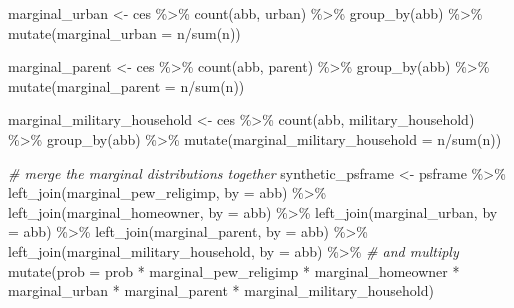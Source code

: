\documentclass[
]{article}
\newenvironment{Shaded}{\begin{snugshade}}{\end{snugshade}}
\newcommand{\AttributeTok}[1]{\textcolor[rgb]{0.77,0.63,0.00}{#1}}
\newcommand{\CommentTok}[1]{\textcolor[rgb]{0.56,0.35,0.01}{\textit{#1}}}
\newcommand{\FunctionTok}[1]{\textcolor[rgb]{0.00,0.00,0.00}{#1}}
\newcommand{\NormalTok}[1]{#1}
\newcommand{\OtherTok}[1]{\textcolor[rgb]{0.56,0.35,0.01}{#1}}
\newcommand{\SpecialCharTok}[1]{\textcolor[rgb]{0.00,0.00,0.00}{#1}}
\newcommand{\StringTok}[1]{\textcolor[rgb]{0.31,0.60,0.02}{#1}}
\begin{document}
\begin{Shaded}
\begin{Highlighting}[]
\NormalTok{marginal\_urban }\OtherTok{\textless{}{-}}\NormalTok{ ces }\SpecialCharTok{\%\textgreater{}\%} 
  \FunctionTok{count}\NormalTok{(abb, urban) }\SpecialCharTok{\%\textgreater{}\%} 
  \FunctionTok{group\_by}\NormalTok{(abb) }\SpecialCharTok{\%\textgreater{}\%} 
  \FunctionTok{mutate}\NormalTok{(}\AttributeTok{marginal\_urban =}\NormalTok{ n}\SpecialCharTok{/}\FunctionTok{sum}\NormalTok{(n))}

\NormalTok{marginal\_parent }\OtherTok{\textless{}{-}}\NormalTok{ ces }\SpecialCharTok{\%\textgreater{}\%} 
  \FunctionTok{count}\NormalTok{(abb, parent) }\SpecialCharTok{\%\textgreater{}\%} 
  \FunctionTok{group\_by}\NormalTok{(abb) }\SpecialCharTok{\%\textgreater{}\%} 
  \FunctionTok{mutate}\NormalTok{(}\AttributeTok{marginal\_parent =}\NormalTok{ n}\SpecialCharTok{/}\FunctionTok{sum}\NormalTok{(n))}

\NormalTok{marginal\_military\_household }\OtherTok{\textless{}{-}}\NormalTok{ ces }\SpecialCharTok{\%\textgreater{}\%} 
  \FunctionTok{count}\NormalTok{(abb, military\_household) }\SpecialCharTok{\%\textgreater{}\%} 
  \FunctionTok{group\_by}\NormalTok{(abb) }\SpecialCharTok{\%\textgreater{}\%} 
  \FunctionTok{mutate}\NormalTok{(}\AttributeTok{marginal\_military\_household =}\NormalTok{ n}\SpecialCharTok{/}\FunctionTok{sum}\NormalTok{(n))}

\CommentTok{\# merge the marginal distributions together}
\NormalTok{synthetic\_psframe }\OtherTok{\textless{}{-}}\NormalTok{ psframe }\SpecialCharTok{\%\textgreater{}\%} 
  \FunctionTok{left\_join}\NormalTok{(marginal\_pew\_religimp, }\AttributeTok{by =} \StringTok{\textquotesingle{}abb\textquotesingle{}}\NormalTok{) }\SpecialCharTok{\%\textgreater{}\%} 
  \FunctionTok{left\_join}\NormalTok{(marginal\_homeowner, }\AttributeTok{by =} \StringTok{\textquotesingle{}abb\textquotesingle{}}\NormalTok{) }\SpecialCharTok{\%\textgreater{}\%} 
  \FunctionTok{left\_join}\NormalTok{(marginal\_urban, }\AttributeTok{by =} \StringTok{\textquotesingle{}abb\textquotesingle{}}\NormalTok{) }\SpecialCharTok{\%\textgreater{}\%} 
  \FunctionTok{left\_join}\NormalTok{(marginal\_parent, }\AttributeTok{by =} \StringTok{\textquotesingle{}abb\textquotesingle{}}\NormalTok{) }\SpecialCharTok{\%\textgreater{}\%} 
  \FunctionTok{left\_join}\NormalTok{(marginal\_military\_household, }\AttributeTok{by =} \StringTok{\textquotesingle{}abb\textquotesingle{}}\NormalTok{) }\SpecialCharTok{\%\textgreater{}\%} 
  \CommentTok{\# and multiply}
  \FunctionTok{mutate}\NormalTok{(}\AttributeTok{prob =}\NormalTok{ prob }\SpecialCharTok{*}\NormalTok{ marginal\_pew\_religimp }\SpecialCharTok{*}
\NormalTok{           marginal\_homeowner }\SpecialCharTok{*}\NormalTok{ marginal\_urban }\SpecialCharTok{*}
\NormalTok{           marginal\_parent }\SpecialCharTok{*}\NormalTok{ marginal\_military\_household)}
\end{Highlighting}
\end{Shaded}
\end{document}
